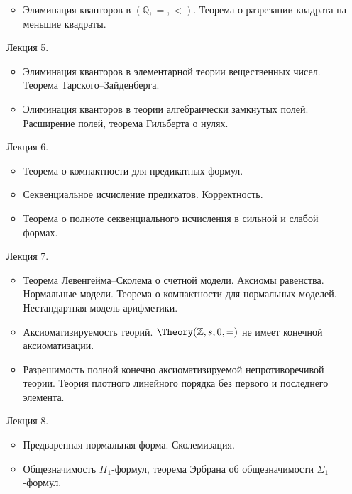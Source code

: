 \begin{enumerate}
\begin{itemize}
            \item Элиминация кванторов в $(\mathbb{Q}, =, <)$. Теорема о разрезании квадрата на меньшие
                квадраты.
        \end{itemize}
    \item[Лекция 5.]
        \begin{itemize}
            \item Элиминация кванторов в элементарной теории вещественных чисел. Теорема
                Тарского--Зайденберга.
            \item Элиминация кванторов в теории алгебраически замкнутых полей. Расширение полей, теорема
                Гильберта о нулях. 
        \end{itemize}
    \item[Лекция 6.]
        \begin{itemize}
            \item Теорема о компактности для предикатных формул.
            \item Секвенциальное исчисление предикатов. Корректность.
            \item Теорема о полноте секвенциального исчисления в сильной и слабой формах. 
        \end{itemize}
    \item[Лекция 7.]
        \begin{itemize}
            \item Теорема Левенгейма--Сколема о счетной модели. Аксиомы равенства. Нормальные
                модели. Теорема о компактности для нормальных моделей. Нестандартная модель арифметики.
            \item Аксиоматизируемость теорий. $\Theory(\mathbb{Z}, s, 0, =)$ не имеет конечной
                аксиоматизации.
            \item Разрешимость полной конечно аксиоматизируемой непротиворечивой теории. Теория плотного
                линейного порядка без первого и последнего элемента.
        \end{itemize}
    \item[Лекция 8.]
        \begin{itemize}
            \item Предваренная нормальная форма. Сколемизация. 
            \item Общезначимость $\Pi_1$-формул, теорема Эрбрана об общезначимости $\Sigma_1$-формул.
        \end{itemize}
\end{enumerate}
